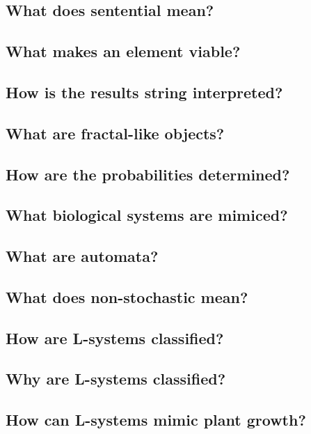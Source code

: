 \documentclass[11pt]{report}
\begin{document}
\subsection{What does sentential mean?}

\subsection{What makes an element viable?}

\subsection{How is the results string interpreted?}

\subsection{What are fractal-like objects?}

\subsection{How are the probabilities determined?}

\subsection{What biological systems are mimiced?}

\subsection{What are automata?}

\subsection{What does non-stochastic mean?}

\subsection{How are L-systems classified?}

\subsection{Why are L-systems classified?}

\subsection{How can L-systems mimic plant growth?}
\end{document}
